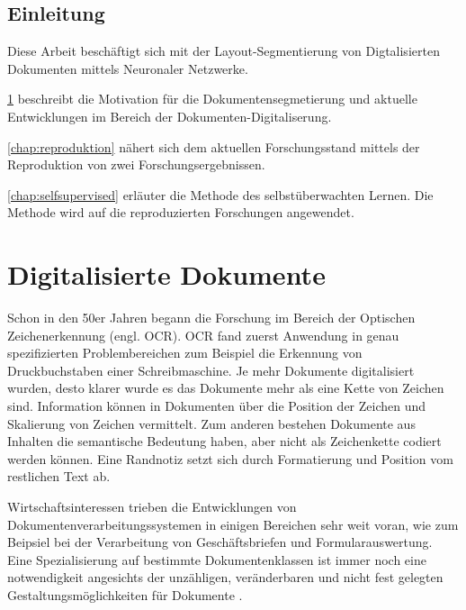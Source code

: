 

\section*{Einleitung}
Diese Arbeit beschäftigt sich mit der Layout-Segmentierung von Digtalisierten Dokumenten mittels Neuronaler Netzwerke.

\cref{chap:documents} beschreibt die Motivation für die Dokumentensegmetierung und aktuelle Entwicklungen im
Bereich der Dokumenten-Digitaliserung.

\cref{chap:reproduktion} nähert sich dem aktuellen Forschungsstand mittels der Reproduktion von zwei Forschungsergebnissen.

\cref{chap:selfsupervised} erläuter die Methode des selbstüberwachten Lernen. Die Methode wird auf die reproduzierten Forschungen angewendet.

\chapter{Digitalisierte Dokumente}
\label{chap:documents}


% 
Schon in den 50er Jahren begann die Forschung im Bereich der Optischen Zeichenerkennung 
(engl. OCR)\autocite{DoermannHandbookdocumentimage2014}. OCR fand zuerst Anwendung in genau 
spezifizierten Problembereichen zum Beispiel die Erkennung von Druckbuchstaben einer Schreibmaschine. 
Je mehr Dokumente digitalisiert wurden, desto klarer wurde es das Dokumente mehr als 
eine Kette von Zeichen sind. 
Information können in Dokumenten über die Position der Zeichen und Skalierung von Zeichen vermittelt.
Zum anderen bestehen Dokumente aus Inhalten die semantische Bedeutung haben, aber nicht als Zeichenkette codiert werden können. 
Eine Randnotiz setzt sich durch Formatierung und Position vom restlichen Text ab. 

Wirtschaftsinteressen trieben die Entwicklungen von Dokumentenverarbeitungssystemen in einigen Bereichen sehr weit voran, wie 
zum Beipsiel bei der Verarbeitung von Geschäftsbriefen und Formularauswertung.
Eine Spezialisierung auf bestimmte Dokumentenklassen ist immer noch eine notwendigkeit angesichts der unzähligen, veränderbaren und nicht fest gelegten Gestaltungsmöglichkeiten für Dokumente \autocite[69]{BairdEvolutionDocumentImage2014}.


